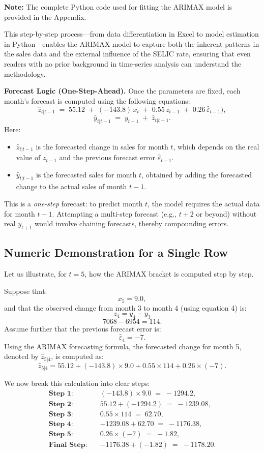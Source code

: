 \documentclass{article}
\begin{document}
\textbf{Note:} The complete Python code used for fitting the ARIMAX model is provided in the Appendix.

This step-by-step process—from data differentiation in Excel to model estimation in Python—enables the ARIMAX model to capture both the inherent patterns in the sales data and the external influence of the SELIC rate, ensuring that even readers with no prior background in time-series analysis can understand the methodology.


\textbf{Forecast Logic (One-Step-Ahead).}  
Once the parameters are fixed, each month’s forecast is computed using the following equations:
\[
\hat{z}_{t|t-1} \;=\; 55.12 \;+\; (-143.8)\,x_t \;+\; 0.55\,z_{t-1} \;+\; 0.26\,\hat{\varepsilon}_{t-1}),
\]
\begin{equation}  
\hat{y}_{t|t-1} \;=\; y_{t-1} \;+\; \hat{z}_{t|t-1}.
\end{equation}
Here:
\begin{itemize}
    \item \(\hat{z}_{t|t-1}\) is the forecasted change in sales for month \(t\), which depends on the real value of \(z_{t-1}\) and the previous forecast error \(\hat{\varepsilon}_{t-1}\).
    \item \(\hat{y}_{t|t-1}\) is the forecasted sales for month \(t\), obtained by adding the forecasted change to the actual sales of month \(t-1\).
\end{itemize}
This is a \emph{one-step} forecast: to predict month \(t\), the model requires the actual data for month \(t-1\). Attempting a multi-step forecast (e.g., \(t+2\) or beyond) without real \(y_{t+1}\) would involve chaining forecasts, thereby compounding errors.

\subsection{Numeric Demonstration for a Single Row}
Let us illustrate, for \(t=5\), how the ARIMAX bracket is computed step by step.

Suppose that:
\[
x_5 = 9.0,
\]
and that the observed change from month 3 to month 4 (using equation 4) is:
\[
z_4 = y_4 - y_3 \] \[ 7068-6954= 114.
\]
Assume further that the previous forecast error is:
\[
\hat{\varepsilon}_4 = -7.
\]
Using the ARIMAX forecasting formula, the forecasted change for month 5, denoted by \(\hat{z}_{5|4}\), is computed as:
\[
\hat{z}_{5|4} = 55.12 + (-143.8)\times 9.0 + 0.55\times 114 + 0.26\times (-7).
\]

We now break this calculation into clear steps:
\begin{align*}
\textbf{Step 1:} \quad & (-143.8) \times 9.0 \;=\; -1294.2, \\
\textbf{Step 2:} \quad & 55.12 + (-1294.2) \;=\; -1239.08, \\
\textbf{Step 3:} \quad & 0.55 \times 114 \;=\; 62.70, \\
\textbf{Step 4:} \quad & -1239.08 + 62.70 \;=\; -1176.38, \\
\textbf{Step 5:} \quad & 0.26 \times (-7) \;=\; -1.82, \\
\textbf{Final Step:} \quad & -1176.38 + (-1.82) \;=\; -1178.20.
\end{align*}
\end{document}
